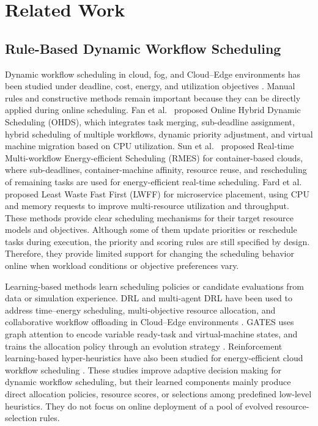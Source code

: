 \documentclass[10pt,journal]{IEEEtran}
\begin{document}
\section{Related Work}
\label{Sec: related work}

\subsection{Rule-Based Dynamic Workflow Scheduling}

Dynamic workflow scheduling in cloud, fog, and Cloud--Edge environments has been studied under deadline, cost, energy, and utilization objectives \cite{ohds,rmes,li2024,lou2023,lwff}. Manual rules and constructive methods remain important because they can be directly applied during online scheduling. Fan et al.~\cite{ohds} proposed Online Hybrid Dynamic Scheduling (OHDS), which integrates task merging, sub-deadline assignment, hybrid scheduling of multiple workflows, dynamic priority adjustment, and virtual machine migration based on CPU utilization. Sun et al.~\cite{rmes} proposed Real-time Multi-workflow Energy-efficient Scheduling (RMES) for container-based clouds, where sub-deadlines, container-machine affinity, resource reuse, and rescheduling of remaining tasks are used for energy-efficient real-time scheduling. Fard et al.~\cite{lwff} proposed Least Waste Fast First (LWFF) for microservice placement, using CPU and memory requests to improve multi-resource utilization and throughput. These methods provide clear scheduling mechanisms for their target resource models and objectives. Although some of them update priorities or reschedule tasks during execution, the priority and scoring rules are still specified by design. Therefore, they provide limited support for changing the scheduling behavior online when workload conditions or objective preferences vary.

Learning-based methods learn scheduling policies or candidate evaluations from data or simulation experience. DRL and multi-agent DRL have been used to address time--energy scheduling, multi-objective resource allocation, and collaborative workflow offloading in Cloud--Edge environments \cite{jayanetti2022,zhang2024,xiao2025}. GATES uses graph attention to encode variable ready-task and virtual-machine states, and trains the allocation policy through an evolution strategy \cite{gates}. Reinforcement learning-based hyper-heuristics have also been studied for energy-efficient cloud workflow scheduling \cite{li2025qphh}. These studies improve adaptive decision making for dynamic workflow scheduling, but their learned components mainly produce direct allocation policies, resource scores, or selections among predefined low-level heuristics. They do not focus on online deployment of a pool of evolved resource-selection rules.
\end{document}
